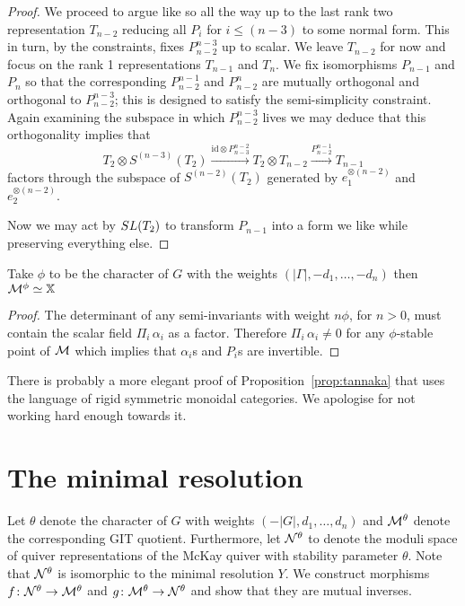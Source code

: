 \documentclass{amsart}
\theoremstyle{definition}
\begin{document}
\begin{proof}
We proceed to argue like so all the way up to the last rank two representation $T_{n-2}$ reducing all $P_i$ for $i\leq (n-3)$ to some normal form.
This in turn, by the constraints, fixes $P_{n-2}^{n-3}$ up to scalar.
We leave $T_{n-2}$ for now and focus on the rank 1 representations $T_{n-1}$ and $T_n$.
We fix isomorphisms $P_{n-1}$ and $P_n$ so that the corresponding $P_{n-2}^{n-1}$ and $P_{n-2}^{n}$ are mutually orthogonal and orthogonal to $P_{n-2}^{n-3}$; this is designed to satisfy the semi-simplicity constraint.
Again examining the subspace in which $P_{n-2}^{n-3}$ lives we may deduce that this orthogonality implies that $$T_2 \otimes S^{(n-3)}(T_2) \xrightarrow{\text{id} \otimes P_{n-3}^{n-2}} T_2 \otimes T_{n-2} \xrightarrow{P_{n-2}^{n-1}} T_{n-1}$$
factors through the subspace of $S^{(n-2)}(T_2)$ generated by $e_1^{\otimes (n-2)}$ and $e_2^{\otimes (n-2)}$.

Now we may act by $SL(T_2)$ to transform $P_{n-1}$ into a form we like while preserving everything else.

\end{proof}

\begin{corollary}
Take $\phi$ to be the character of $G$ with the weights $(|\Gamma|, -d_1,\ldots, -d_n)$ then $\mathcal{M}^\phi \simeq \mathbb{X}$
\end{corollary}

\begin{proof}
The determinant of any semi-invariants with weight $n \phi$, for $n>0$, must contain the scalar field $\Pi_i \, \alpha_i$ as a factor.
Therefore $\Pi_i \, \alpha_i \neq 0$ for any $\phi$-stable point of $\mathcal{M}$ which implies that $\alpha_i$s and $P_i$s are invertible.
\end{proof}

\begin{remark}
There is probably a more elegant proof of Proposition~\ref{prop:tannaka} that uses the language of rigid symmetric monoidal categories.
We apologise for not working hard enough towards it.
\end{remark}

\section{The minimal resolution}

Let $\theta$ denote the character of $G$ with weights $(-|G|,d_1,\ldots,d_n)$ and $\mathcal{M}^\theta$ denote the corresponding GIT quotient.
Furthermore, let $\mathcal{N}^\theta$ to denote the moduli space of quiver representations of the McKay quiver with stability parameter $\theta$.
Note that $\mathcal{N}^\theta$ is isomorphic to the minimal resolution $Y$.
We construct morphisms $f \colon \mathcal{N}^\theta \rightarrow \mathcal{M}^\theta$ and $g \colon \mathcal{M}^\theta \rightarrow \mathcal{N}^\theta$ and show that they are mutual inverses.
\end{document}

